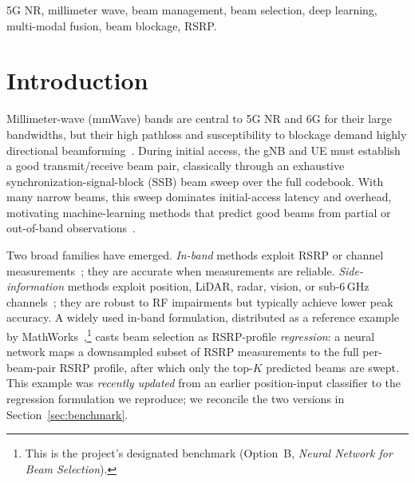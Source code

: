 \documentclass[conference]{IEEEtran}
\begin{document}
\begin{IEEEkeywords}
5G NR, millimeter wave, beam management, beam selection, deep learning,
multi-modal fusion, beam blockage, RSRP.
\end{IEEEkeywords}

\section{Introduction}
Millimeter-wave (mmWave) bands are central to 5G NR and 6G for their large
bandwidths, but their high pathloss and susceptibility to blockage demand highly
directional beamforming~\cite{xue2024survey}. During initial access, the
gNB and UE must establish a good transmit/receive beam pair, classically through
an exhaustive synchronization-signal-block (SSB) beam sweep over the full
codebook. With many narrow beams, this sweep dominates initial-access latency and
overhead, motivating machine-learning methods that predict good beams from
partial or out-of-band observations~\cite{heng2019mlbeam,klautau2018itadata}.

Two broad families have emerged. \emph{In-band} methods exploit RSRP or channel
measurements~\cite{sim2020sub6,polese2021deepbeam}; they are accurate when
measurements are reliable. \emph{Side-information} methods exploit position,
LiDAR, radar, vision, or sub-6\,GHz channels~\cite{klautau2019lidar,
rezaie2022location,alkhateeb2023deepsense,demirhan2022radar,deng2025scanbest};
they are robust to RF impairments but typically achieve lower peak accuracy.
A widely used in-band formulation, distributed as a reference example by
MathWorks~\cite{mathworks2025beamselect},\footnote{This is the project's
designated benchmark (Option~B, \emph{Neural Network for Beam Selection}).}
casts beam selection as RSRP-profile
\emph{regression}: a neural network maps a downsampled subset of RSRP
measurements to the full per-beam-pair RSRP profile, after which only the top-$K$
predicted beams are swept. This example was \emph{recently updated} from an
earlier position-input classifier to the regression formulation we reproduce; we
reconcile the two versions in Section~\ref{sec:benchmark}.
\end{document}
